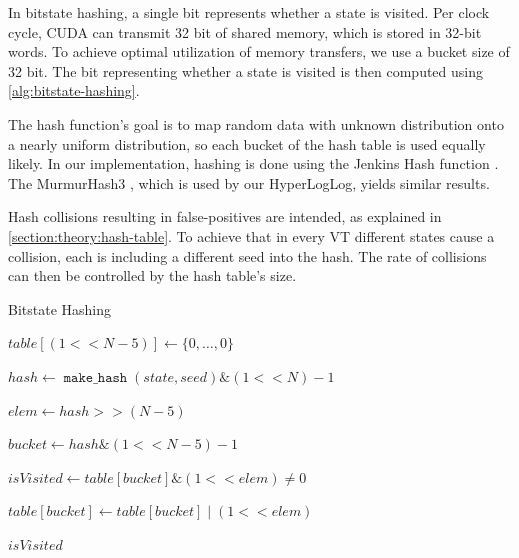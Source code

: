 \documentclass[
fancyheadings, %
%
%
]{stsreprt}
\DeclareMathOperator{\markVisited}{\texttt{mark\_visited}}
\DeclareMathOperator{\makeHash}{\texttt{make\_hash}}
\newcommand{\bitwiseAnd}{\mathbin{\text{\&}}}
\newcommand{\bitwiseOr}{\mathbin{\text{|}}}
\begin{document}
In bitstate hashing, a single bit represents whether a state is visited.
Per clock cycle, CUDA can transmit 32 bit of shared memory, which is stored in 32-bit words.
To achieve optimal utilization of memory transfers, we use a bucket size of 32 bit.
The bit representing whether a state is visited is then computed using \cref{alg:bitstate-hashing}.

The hash function's goal is to map random data with unknown distribution onto a nearly uniform distribution, so each bucket of the hash table is used equally likely.
In our implementation, hashing is done using the Jenkins Hash function \cite{JenkinsHash}.
The MurmurHash3 \cite{MurmurHash3}, which is used by our HyperLogLog, yields similar results.

Hash collisions resulting in false-positives are intended, as explained in \cref{section:theory:hash-table}.
To achieve that in every VT different states cause a collision, each is including a different seed into the hash.
The rate of collisions can then be controlled by the hash table's size.

\begin{algorithm}
    \caption{Bitstate Hashing}
    \label{alg:bitstate-hashing}
    \begin{algorithmic}
        \State $table[(1 << N - 5)] \gets \{0, \dots, 0\}$

        \Statex

        \Function{$\markVisited$}{table, state}
        \State $hash \gets \makeHash(state, seed) \bitwiseAnd (1 << N) - 1$

        \State $elem \gets hash >> (N - 5)$

        \State $bucket \gets hash \bitwiseAnd (1 << N - 5) - 1$

        \State $isVisited \gets table[bucket] \bitwiseAnd (1 << elem) \neq 0$

        \State $table[bucket] \gets table[bucket] \bitwiseOr (1 << elem)$

        \Statex

        \State \Return $isVisited$
        \EndFunction
    \end{algorithmic}
\end{algorithm}
\end{document}
